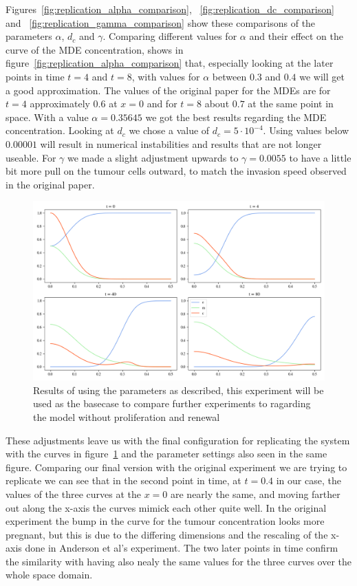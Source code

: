 Figures~\ref{fig:replication_alpha_comparison}, ~\ref{fig:replication_dc_comparison} and ~\ref{fig:replication_gamma_comparison} show these comparisons of the parameters $\alpha$, $d_c$ and $\gamma$. Comparing different values for $\alpha$ and their effect on the curve of the MDE concentration, shows in figure~\ref{fig:replication_alpha_comparison} that, especially looking at the later points in time $t=4$ and $t=8$, with values for $\alpha$ between $0.3$ and $0.4$ we will get a good approximation. The values of the original paper for the MDEs are for $t=4$ approximately $0.6$ at $x=0$ and for $t=8$ about $0.7$ at the same point in space. With a value  $\alpha=0.35645$ we got the best results regarding the MDE concentration.\newline 
Looking at $d_c$ we chose a value of $d_c=5\cdot 10^{-4}$. Using values below $0.00001$ will result in numerical instabilities and results that are not longer useable. For $\gamma$ we made a slight adjustment upwards to $\gamma=0.0055$ to have a little bit more pull on the tumour cells outward, to match the invasion speed observed in the original paper. 
\begin{figure}[h]
    \centering
    \includegraphics[width=\textwidth]{resources/images/basecase_without_proliferation_.png}
    \caption{Results of using the parameters as described, this experiment will be used as the basecase to compare further experiments to ragarding the model without proliferation and renewal}
    \label{fig:basecase_without_proliferation}
\end{figure}

These adjustments leave us with the final configuration for replicating the system with the curves in figure~\ref{fig:basecase_without_proliferation} and the parameter settings also seen in the same figure. Comparing our final version with the original experiment we are trying to replicate we can see that in the second point in time, at $t=0.4$ in our case, the values of the three curves at the $x=0$ are nearly the same, and moving farther out along the x-axis the curves mimick each other quite well. In the original experiment the bump in the curve for the tumour concentration looks more pregnant, but this is due to the differing dimensions and the rescaling of the x-axis done in Anderson et al's experiment. The two later points in time confirm the similarity with having also nealy the same values for the three curves over the whole space domain.



